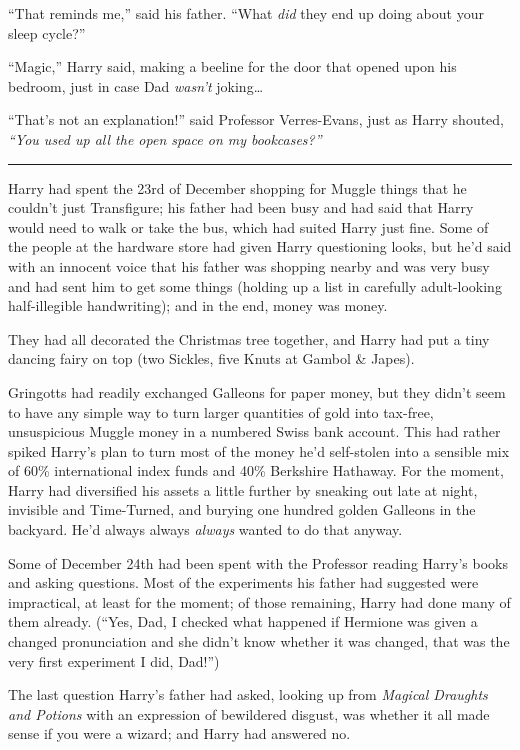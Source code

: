 ``That reminds me,'' said his father. ``What \emph{did} they end up
doing about your sleep cycle?''

``Magic,'' Harry said, making a beeline for the door that opened upon
his bedroom, just in case Dad \emph{wasn't} joking\ldots{}

``That's not an explanation!'' said Professor Verres-Evans, just as
Harry shouted, \emph{``You used up all the open space on my
bookcases?''}

\begin{center}\rule{3in}{0.4pt}\end{center}

Harry had spent the 23rd of December shopping for Muggle things that he
couldn't just Transfigure; his father had been busy and had said that
Harry would need to walk or take the bus, which had suited Harry just
fine. Some of the people at the hardware store had given Harry
questioning looks, but he'd said with an innocent voice that his father
was shopping nearby and was very busy and had sent him to get some
things (holding up a list in carefully adult-looking half-illegible
handwriting); and in the end, money was money.

They had all decorated the Christmas tree together, and Harry had put a
tiny dancing fairy on top (two Sickles, five Knuts at Gambol \& Japes).

Gringotts had readily exchanged Galleons for paper money, but they
didn't seem to have any simple way to turn larger quantities of gold
into tax-free, unsuspicious Muggle money in a numbered Swiss bank
account. This had rather spiked Harry's plan to turn most of the money
he'd self-stolen into a sensible mix of 60\% international index funds
and 40\% Berkshire Hathaway. For the moment, Harry had diversified his
assets a little further by sneaking out late at night, invisible and
Time-Turned, and burying one hundred golden Galleons in the backyard.
He'd always always \emph{always} wanted to do that anyway.

Some of December 24th had been spent with the Professor reading Harry's
books and asking questions. Most of the experiments his father had
suggested were impractical, at least for the moment; of those remaining,
Harry had done many of them already. (``Yes, Dad, I checked what
happened if Hermione was given a changed pronunciation and she didn't
know whether it was changed, that was the very first experiment I did,
Dad!'')

The last question Harry's father had asked, looking up from
\emph{Magical Draughts and Potions} with an expression of bewildered
disgust, was whether it all made sense if you were a wizard; and Harry
had answered no.

